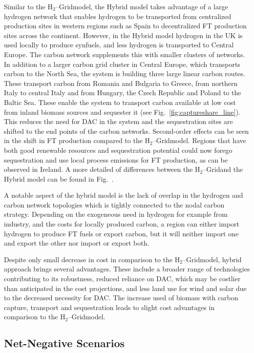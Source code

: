 \documentclass[twocolumn]{article}
\newcommand{\hydrogen}{H$_2$}
\newcommand{\hydrogengrid}{\hydrogen{}--Grid}
\begin{document}
Similar to the \hydrogengrid model, the Hybrid model takes advantage of a large hydrogen network that enables hydrogen to be transported from centralized production sites in western regions such as Spain to decentralized FT production sites across the continent. However, in the Hybrid model hydrogen in the UK is used locally to produce synfuels, and less hydrogen is transported to Central Europe.
The carbon network supplements this with smaller clusters of networks. In addition to a larger carbon grid cluster in Central Europe, which transports carbon to the North Sea, the system is building three large linear carbon routes. These transport carbon from Romania and Bulgaria to Greece, from northern Italy to central Italy and from Hungary, the Czech Republic and Poland to the Baltic Sea. These enable the system to transport carbon available at low cost from inland biomass sources and sequester it (see Fig.~\ref{fig:captureshare_line}). This reduces the need for DAC in the system and the sequestration sites are shifted to the end points of the carbon networks. Second-order effects can be seen in the shift in FT production compared to the \hydrogengrid model. Regions that have both good renewable resources and sequestration potential could now forego sequestration and use local process emissions for FT production, as can be observed in Ireland. A more detailed of differences between the \hydrogengrid and the Hybrid model can be found in Fig.~.


A notable aspect of the hybrid model is the lack of overlap in the hydrogen and carbon network topologies which is tightly connected to the nodal carbon strategy. Depending on the exogeneous need in hydrogen for example from industry, and the costs for locally produced carbon, a region can either import hydrogen to produce FT fuels or export carbon, but it will neither import one and export the other nor import or export both.


Despite only small decrease in cost in comparison to the \hydrogengrid model, hybrid approach brings several advantages. These include a broader range of technologies contributing to its robustness, reduced reliance on DAC, which may be costlier than anticipated in the cost projections, and less land use for wind and solar due to the decreased necessity for DAC. The increase used of biomass with carbon capture, transport and sequestration leads to slight cost advantages in comparison to the \hydrogengrid model.



\subsection*{Net-Negative Scenarios}
\end{document}
